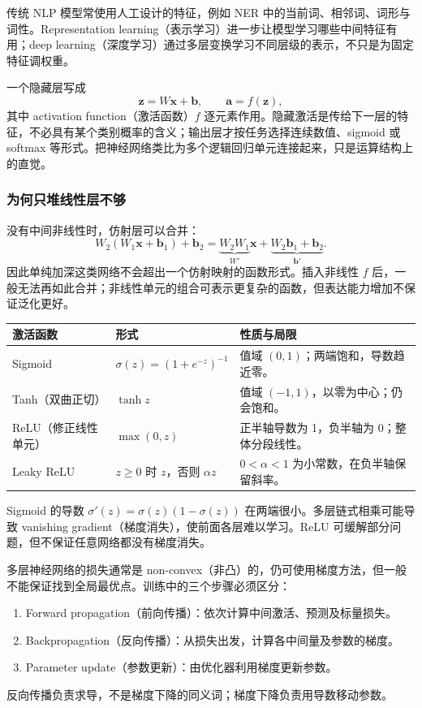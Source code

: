 
传统 NLP 模型常使用人工设计的特征，例如 NER 中的当前词、相邻词、词形与词性。Representation learning（表示学习）进一步让模型学习哪些中间特征有用；deep learning（深度学习）通过多层变换学习不同层级的表示，不只是为固定特征调权重。

一个隐藏层写成
\[
  \mathbf z=W\mathbf x+\mathbf b,
  \qquad \mathbf a=f(\mathbf z),
\]
其中 activation function（激活函数）$f$ 逐元素作用。隐藏激活是传给下一层的特征，不必具有某个类别概率的含义；输出层才按任务选择连续数值、sigmoid 或 softmax 等形式。把神经网络类比为多个逻辑回归单元连接起来，只是运算结构上的直觉。

\subsubsection{为何只堆线性层不够}

没有中间非线性时，仿射层可以合并：
\[
  W_2(W_1\mathbf x+\mathbf b_1)+\mathbf b_2
  =\underbrace{W_2W_1}_{W'}\mathbf x+
   \underbrace{W_2\mathbf b_1+\mathbf b_2}_{\mathbf b'}.
\]
因此单纯加深这类网络不会超出一个仿射映射的函数形式。插入非线性 $f$ 后，一般无法再如此合并；非线性单元的组合可表示更复杂的函数，但表达能力增加不保证泛化更好。

\begin{center}
\small
\begin{tabularx}{\textwidth}{@{}l l X@{}}
\toprule
激活函数 & 形式 & 性质与局限 \\
\midrule
Sigmoid & $\sigma(z)=(1+e^{-z})^{-1}$ & 值域 $(0,1)$；两端饱和，导数趋近零。\\
Tanh（双曲正切） & $\tanh z$ & 值域 $(-1,1)$，以零为中心；仍会饱和。\\
ReLU（修正线性单元） & $\max(0,z)$ & 正半轴导数为 1，负半轴为 0；整体分段线性。\\
Leaky ReLU & $z\ge0$ 时 $z$，否则 $\alpha z$ & $0<\alpha<1$ 为小常数，在负半轴保留斜率。\\
\bottomrule
\end{tabularx}
\end{center}

Sigmoid 的导数 $\sigma'(z)=\sigma(z)(1-\sigma(z))$ 在两端很小。多层链式相乘可能导致 vanishing gradient（梯度消失），使前面各层难以学习。ReLU 可缓解部分问题，但不保证任意网络都没有梯度消失。


多层神经网络的损失通常是 non-convex（非凸）的，仍可使用梯度方法，但一般不能保证找到全局最优点。训练中的三个步骤必须区分：
\begin{enumerate}
  \item Forward propagation（前向传播）：依次计算中间激活、预测及标量损失。
  \item Backpropagation（反向传播）：从损失出发，计算各中间量及参数的梯度。
  \item Parameter update（参数更新）：由优化器利用梯度更新参数。
\end{enumerate}
反向传播负责求导，不是梯度下降的同义词；梯度下降负责用导数移动参数。

